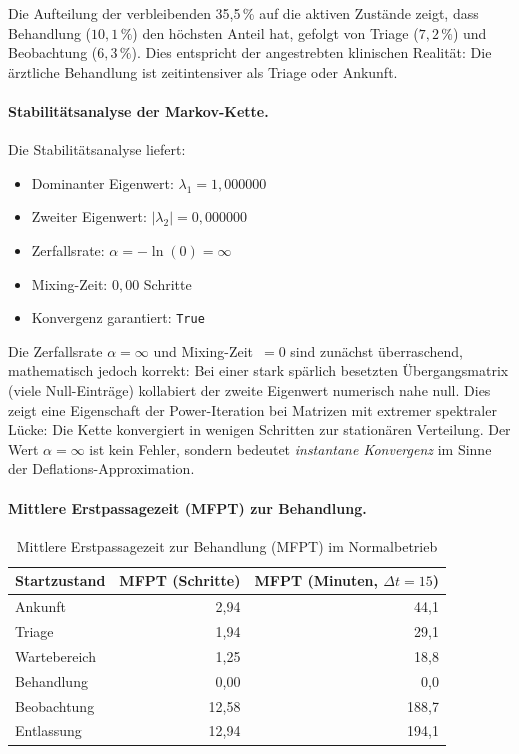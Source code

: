 ﻿\documentclass[a4paper,12pt]{report}
\theoremstyle{definition}
\begin{document}
Die Aufteilung der verbleibenden 35{,}5\,\% auf die aktiven Zustände
zeigt, dass Behandlung ($10{,}1\,\%$) den höchsten Anteil hat, gefolgt
von Triage ($7{,}2\,\%$) und Beobachtung ($6{,}3\,\%$). Dies entspricht
der angestrebten klinischen Realität: Die ärztliche Behandlung ist
zeitintensiver als Triage oder Ankunft.

\paragraph{Stabilitätsanalyse der Markov-Kette.}
Die Stabilitätsanalyse liefert:
\begin{itemize}
	\item[-] Dominanter Eigenwert: $\lambda_1 = 1{,}000000$
	\item[-] Zweiter Eigenwert: $|\lambda_2| = 0{,}000000$
	\item[-] Zerfallsrate: $\alpha = -\ln(0) = \infty$
	\item[-] Mixing-Zeit: $0{,}00$ Schritte
	\item[-] Konvergenz garantiert: \texttt{True}
\end{itemize}

Die Zerfallsrate $\alpha = \infty$ und Mixing-Zeit~$= 0$ sind zunächst
überraschend, mathematisch jedoch korrekt: Bei einer stark spärlich besetzten
Übergangsmatrix (viele Null-Einträge) kollabiert der zweite Eigenwert
numerisch nahe null. Dies zeigt eine Eigenschaft der Power-Iteration bei
Matrizen mit extremer spektraler Lücke: Die Kette konvergiert in wenigen
Schritten zur stationären Verteilung. Der Wert
$\alpha = \infty$ ist kein Fehler, sondern bedeutet \emph{instantane
	Konvergenz} im Sinne der Deflations-Approximation.

\paragraph{Mittlere Erstpassagezeit (MFPT) zur Behandlung.}
\begin{table}[H]
	\centering
	\begin{tabular}{@{}lrr@{}}
		\toprule
		\textbf{Startzustand} & \textbf{MFPT (Schritte)} & \textbf{MFPT (Minuten, $\Delta t=15$)} \\
		\midrule
		Ankunft     & 2{,}94 & 44{,}1 \\
		Triage      & 1{,}94 & 29{,}1 \\
		Wartebereich& 1{,}25 & 18{,}8 \\
		Behandlung  & 0{,}00 &  0{,}0 \\
		Beobachtung &12{,}58 &188{,}7 \\
		Entlassung  &12{,}94 &194{,}1 \\
		\bottomrule
	\end{tabular}
	\caption{Mittlere Erstpassagezeit zur Behandlung (MFPT) im Normalbetrieb}
	\label{tab:mfpt-normal}
\end{table}
\end{document}
